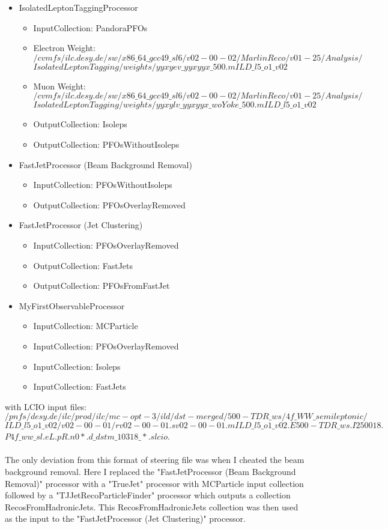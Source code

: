 \begin{itemize}
	\item IsolatedLeptonTaggingProcessor
		\begin{itemize}
			\item InputCollection: PandoraPFOs
			\item Electron Weight:\\
            \texttt{$/cvmfs/ilc.desy.de/sw/x86\_64\_gcc49\_sl6/v02-00-02/MarlinReco/v01-25/Analysis/$}
            \texttt{$IsolatedLeptonTagging/weights/yyxyev\_yyxyyx\_500.mILD\_l5\_o1\_v02$}
			\item Muon Weight: \\
            \texttt{$/cvmfs/ilc.desy.de/sw/x86\_64\_gcc49\_sl6/v02-00-02/MarlinReco/v01-25/Analysis/$}
            \texttt{$IsolatedLeptonTagging/weights/yyxylv\_yyxyyx\_woYoke\_500.mILD\_l5\_o1\_v02$}
			\item OutputCollection: Isoleps
			\item OutputCollection: PFOsWithoutIsoleps
		\end{itemize}
	\item FastJetProcessor (Beam Background Removal)
		\begin{itemize}
			\item InputCollection: PFOsWithoutIsoleps
			\item OutputCollection: PFOsOverlayRemoved
		\end{itemize}
	\item FastJetProcessor (Jet Clustering)
		\begin{itemize}
			\item InputCollection: PFOsOverlayRemoved
			\item OutputCollection: FastJets
			\item OutputCollection: PFOsFromFastJet
		\end{itemize}
	\item MyFirstObservableProcessor
		\begin{itemize}
			\item InputCollection: MCParticle
			\item InputCollection: PFOsOverlayRemoved
			\item InputCollection: Isoleps
			\item InputCollection: FastJets
		\end{itemize}
\end{itemize}
with LCIO input files:\\
\texttt{$/pnfs/desy.de/ilc/prod/ilc/mc-opt-3/ild/dst-merged/500-TDR\_ws/4f\_WW\_semileptonic/$}
\texttt{$ILD\_l5\_o1\_v02/v02-00-01/rv02-00-01.sv02-00-01.mILD\_l5\_o1\_v02.E500-TDR\_ws.I250018.$}
\texttt{$P4f\_ww\_sl.eL.pR.n0*.d\_dstm\_10318\_*.slcio$}.
\\\\
The only deviation from this format of steering file was when I cheated the beam background removal. Here I replaced the "FastJetProcessor (Beam Background Removal)" processor with a "TrueJet" processor with MCParticle input collection followed by a "TJJetRecoParticleFinder" processor which outputs a collection RecosFromHadronicJets. This RecosFromHadronicJets collection was then used as the input to the "FastJetProcessor (Jet Clustering)" processor.

